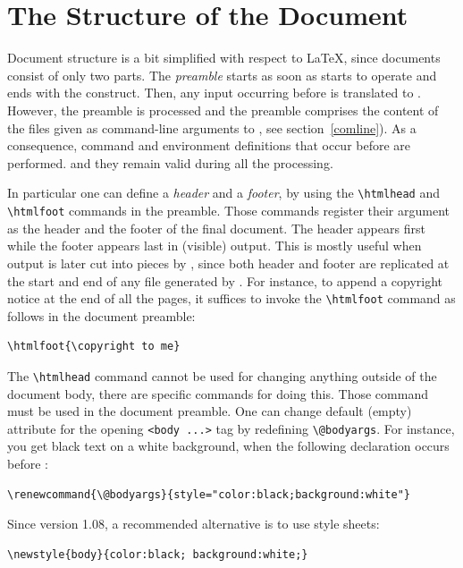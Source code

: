\section{The Structure of the Document}\label{structure}
Document structure is a bit simplified with respect to \LaTeX{}, since
documents consist of only two parts.
The \emph{preamble} starts as soon as \hevea{} starts to operate and
ends with the \verb++ construct.
Then, any input occurring before
\verb++ is translated to \html{}.
However, the preamble is processed
and the preamble comprises the content of the files given as command-line
arguments to \hevea{}, see section~\ref{comline}).
As a consequence, command and environment  definitions that
occur  before \verb++ are performed.
and they remain
valid during all the processing.

In particular one can define a \emph{header} and a \emph{footer}, by using the
\verb+\htmlhead+ and \verb+\htmlfoot+ commands in the preamble.
Those commands register their argument as the header and the footer of
the final \html{} document. The header appears first while the footer
appears last in (visible) \html{} output.
This is mostly useful when \hevea{} output is later cut into pieces by
\hacha{}, since both header and footer are replicated
at the start and end of any file generated by \hacha.
For instance, to append a copyright notice at the end of all the \html{}
pages, it suffices to invoke the \verb+\htmlfoot+ command as follows
in the document preamble:
\begin{verbatim}
\htmlfoot{\copyright to me}
\end{verbatim}


\label{metadef}
The \verb+\htmlhead+ command cannot be used for changing anything outside of
the \html{} document body, there are specific commands for doing this.
Those command must be used in the document preamble.
One can
change \hevea{} default (empty) attribute for
the opening \verb+<body ...>+ tag by redefining
\verb+\@bodyargs+.
For instance, you get black text on a white background, when the
following declaration occurs before \verb++:
\begin{verbatim}
\renewcommand{\@bodyargs}{style="color:black;background:white"}
\end{verbatim}
Since version 1.08, a recommended alternative is to use style sheets:
\begin{verbatim}
\newstyle{body}{color:black; background:white;}
\end{verbatim}


